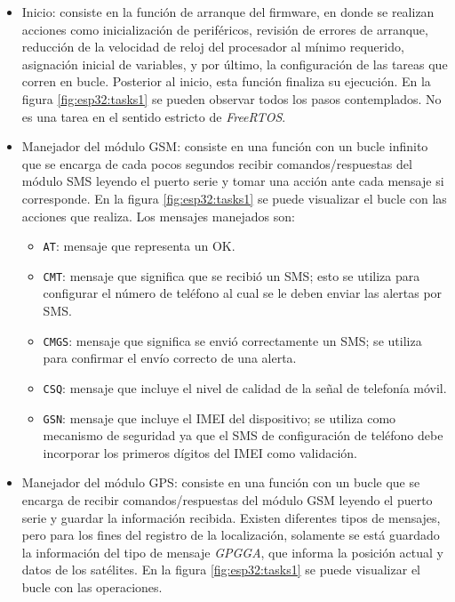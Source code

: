 {\begin{itemize}
	\item Inicio: consiste en la función de arranque del firmware, en donde se realizan acciones como inicialización de periféricos, revisión de errores de arranque, reducción de la velocidad de reloj del procesador al mínimo requerido, asignación inicial de variables, y por último, la configuración de las tareas que corren en bucle. Posterior al inicio, esta función finaliza su ejecución. En la figura \ref{fig:esp32:tasks1} se pueden observar todos los pasos contemplados. No es una tarea en el sentido estricto de \textit{FreeRTOS}.
	\item Manejador del módulo GSM: consiste en una función con un bucle infinito que se encarga de cada pocos segundos recibir comandos/respuestas del módulo SMS leyendo el puerto serie y tomar una acción ante cada mensaje si corresponde. En la figura \ref{fig:esp32:tasks1} se puede visualizar el bucle con las acciones que realiza. Los mensajes manejados son:
		\begin{itemize}
			\item \texttt{AT}: mensaje que representa un OK.
			\item \texttt{CMT}: mensaje que significa que se recibió un SMS; esto se utiliza para configurar el número de teléfono al cual se le deben enviar las alertas por SMS.
			\item \texttt{CMGS}: mensaje que significa se envió correctamente un SMS; se utiliza para confirmar el envío correcto de una alerta.
			\item \texttt{CSQ}: mensaje que incluye el nivel de calidad de la señal de telefonía móvil.
			\item \texttt{GSN}: mensaje que incluye el IMEI del dispositivo; se utiliza como mecanismo de seguridad ya que el SMS de configuración de teléfono debe incorporar los primeros dígitos del IMEI como validación.		
		\end{itemize}
		\item Manejador del módulo GPS: consiste en una función con un bucle que se encarga de recibir comandos/respuestas del módulo GSM leyendo el puerto serie y guardar la información recibida. Existen diferentes tipos de mensajes, pero para los fines del registro de la localización, solamente se está guardado la información del tipo de mensaje \textit{GPGGA}, que informa la posición actual y datos de los satélites\citep{nmea:1}. En la figura \ref{fig:esp32:tasks1} se puede visualizar el bucle con las operaciones.
		\begin{figure}[H]

\end{figure}
\end{itemize}}
